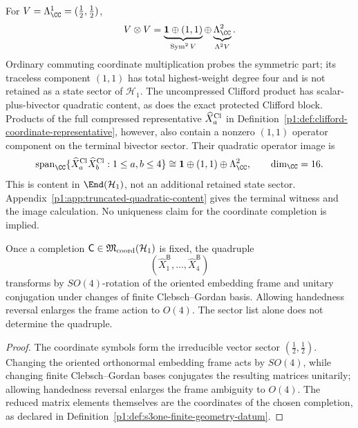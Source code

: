\documentclass[11pt]{article}
\begin{document}
\begin{remark}
\label{p1:rem:symmetric-vs-clifford-quadratic}
For \(V=\Lambda^1_\CC=(\tfrac12,\tfrac12)\),
\[
 V\otimes V
 =\underbrace{\mathbf1\oplus(1,1)}_{\operatorname{Sym}^2V}
 \oplus\underbrace{\Lambda^2_\CC}_{\Lambda^2V}.
\]
Ordinary commuting coordinate multiplication probes the symmetric part; its
traceless component \((1,1)\) has total highest-weight degree four and is not
retained as a state sector of \(\mathcal H_1\).  The uncompressed Clifford
product has scalar-plus-bivector quadratic content, as does the exact
protected Clifford block.  Products of the full compressed representative
\(\widehat X_a^{\rm Cl}\) in
Definition~\ref{p1:def:clifford-coordinate-representative}, however, also
contain a nonzero \((1,1)\) operator component on the terminal bivector
sector.  Their quadratic operator image is
\[
 \operatorname{span}_{\CC}
 \{\widehat X_a^{\rm Cl}\widehat X_b^{\rm Cl}:1\le a,b\le4\}
 \cong\mathbf1\oplus(1,1)\oplus\Lambda^2_\CC,
 \qquad \dim_\CC=16.
\]
This is content in \(\End(\mathcal H_1)\), not an additional retained
state sector.  Appendix~\ref{p1:app:truncated-quadratic-content} gives the
terminal witness and the image calculation.  No uniqueness claim for the
coordinate completion is implied.
\end{remark}


\begin{corollary}
\label{p1:cor:s3one-coordinate-uniqueness}
Once a completion \(\mathsf C\in\mathfrak M_{\rm coord}(\mathcal H_1)\) is fixed, the quadruple
\[
    (\widehat X_1^{\mathsf B},\ldots,\widehat X_4^{\mathsf B})
\]
transforms by \(SO(4)\)-rotation of the oriented embedding frame and unitary
conjugation under changes of finite Clebsch--Gordan basis.  Allowing handedness
reversal enlarges the frame action to \(O(4)\).  The sector list alone does not
determine the quadruple.
\end{corollary}

\begin{proof}
The coordinate symbols form the irreducible vector sector \((\tfrac12,\tfrac12)\).
Changing the oriented orthonormal embedding frame acts by \(SO(4)\), while changing finite
Clebsch--Gordan bases conjugates the resulting matrices unitarily; allowing
handedness reversal enlarges the frame ambiguity to \(O(4)\).  The reduced
matrix elements themselves are the coordinates of the chosen completion, as
declared in Definition~\ref{p1:def:s3one-finite-geometry-datum}.
\end{proof}
\end{document}

